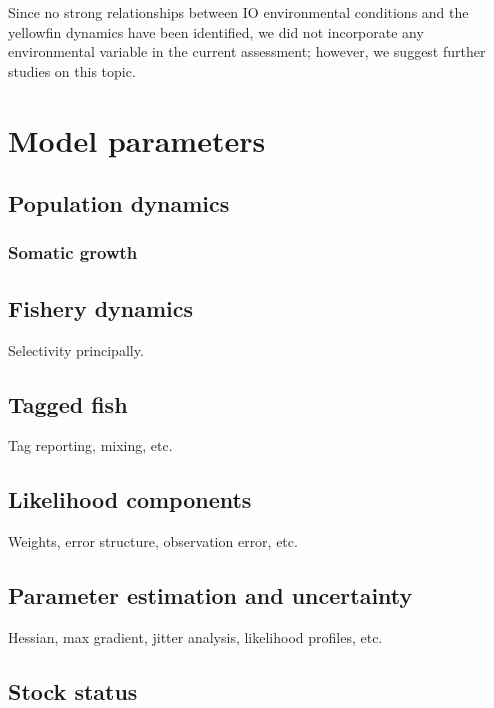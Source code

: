 \documentclass[
]{scrartcl}
\begin{document}
Since no strong relationships between IO environmental conditions and
the yellowfin dynamics have been identified, we did not incorporate any
environmental variable in the current assessment; however, we suggest
further studies on this topic.

\section{Model parameters}\label{model-parameters}

\subsection{Population dynamics}\label{population-dynamics}

\subsubsection{Somatic growth}\label{sec-growth}

\subsection{Fishery dynamics}\label{fishery-dynamics}

Selectivity principally.

\subsection{Tagged fish}\label{tagged-fish}

Tag reporting, mixing, etc.

\subsection{Likelihood components}\label{likelihood-components}

Weights, error structure, observation error, etc.

\subsection{Parameter estimation and
uncertainty}\label{parameter-estimation-and-uncertainty}

Hessian, max gradient, jitter analysis, likelihood profiles, etc.

\subsection{Stock status}\label{stock-status}
\end{document}
